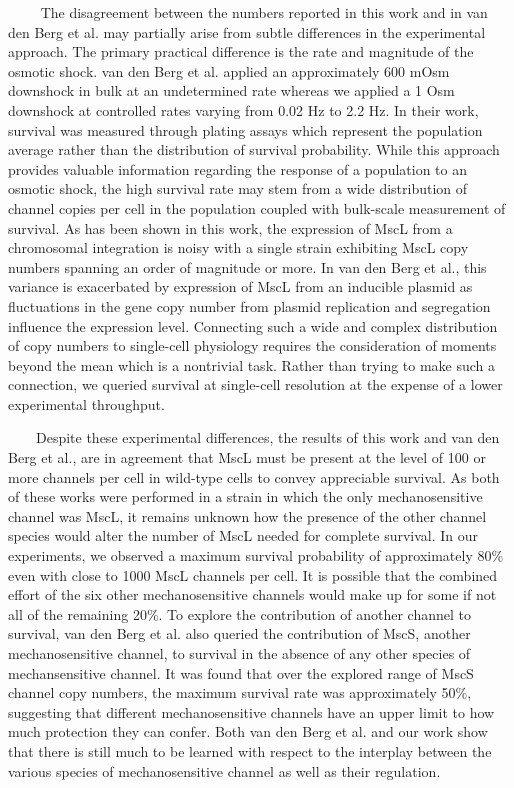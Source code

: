 ~~~~
The
disagreement
between
the
numbers
reported
in
this
work
and in
van
den
Berg
et al.
may
partially
arise
from
subtle
differences
in the
experimental
approach.
The
primary
practical
difference
is the
rate
and
magnitude
of the
osmotic
shock.
van
den
Berg
et al.
applied
an
approximately
600
mOsm
downshock
in
bulk
at an
undetermined
rate
whereas
we
applied
a 1
Osm
downshock
at
controlled
rates
varying
from
0.02
Hz to
2.2
Hz. In
their
work,
survival
was
measured
through
plating
assays
which
represent
the
population
average
rather
than
the
distribution
of
survival
probability.
While
this
approach
provides
valuable
information
regarding
the
response
of a
population
to an
osmotic
shock,
the
high
survival
rate
may
stem
from a
wide
distribution
of
channel
copies
per
cell
in the
population
coupled
with
bulk-scale
measurement
of
survival.
As has
been
shown
in
this
work,
the
expression
of
MscL
from a
chromosomal
integration
is
noisy
with a
single
strain
exhibiting
MscL
copy
numbers
spanning
an
order
of
magnitude
or
more.
In van
den
Berg
et
al.,
this
variance
is
exacerbated
by
expression
of
MscL
from
an
inducible
plasmid
as
fluctuations
in the
gene
copy
number
from
plasmid
replication
and
segregation
influence
the
expression
level.
Connecting
such a
wide
and
complex
distribution
of
copy
numbers
to
single-cell
physiology
requires
the
consideration
of
moments
beyond
the
mean
which
is a
nontrivial
task.
Rather
than
trying
to
make
such a
connection,
we
queried
survival
at
single-cell
resolution
at the
expense
of a
lower
experimental
throughput.

~~~~Despite
these
experimental
differences,
the
results
of
this
work
and
van
den
Berg
et
al.,
are in
agreement
that
MscL
must
be
present
at the
level
of 100
or
more
channels
per
cell
in
wild-type
cells
to
convey
appreciable
survival.
As
both
of
these
works
were
performed
in a
strain
in
which
the
only
mechanosensitive
channel
was
MscL,
it
remains
unknown
how
the
presence
of the
other
channel
species
would
alter
the
number
of
MscL
needed
for
complete
survival.
In our
experiments,
we
observed
a
maximum
survival
probability
of
approximately
80\%
even
with
close
to
1000
MscL
channels
per
cell.
It is
possible
that
the
combined
effort
of the
six
other
mechanosensitive
channels
would
make
up for
some
if not
all of
the
remaining
20\%.
To
explore
the
contribution
of
another
channel
to
survival,
van
den
Berg
et al.
also
queried
the
contribution
of
MscS,
another
mechanosensitive
channel,
to
survival
in the
absence
of any
other
species
of
mechansensitive
channel.
It was
found
that
over
the
explored
range
of
MscS
channel
copy
numbers,
the
maximum
survival
rate
was
approximately
50\%,
suggesting
that
different
mechanosensitive
channels
have
an
upper
limit
to how
much
protection
they
can
confer.
Both
van
den
Berg
et al.
and
our
work
show
that
there
is
still
much
to be
learned
with
respect
to the
interplay
between
the
various
species
of
mechanosensitive
channel
as
well
as
their
regulation.

